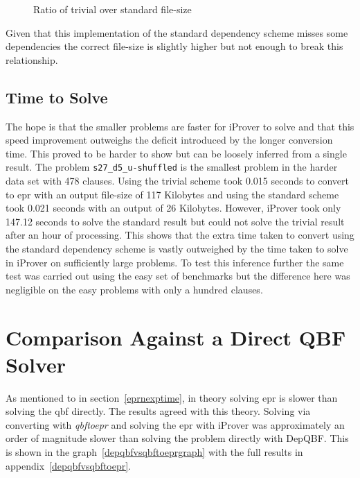 \begin{figure}[h]
\caption{Ratio of trivial over standard file-size}
\label{trivialsizeoverstandardsize}
\begin{CenteredBox}

\end{CenteredBox}
\end{figure}

Given that this implementation of the standard dependency scheme misses some dependencies the correct file-size is slightly higher but not enough to break this relationship.

\subsection{Time to Solve} \label{tvsstdsolve}
The hope is that the smaller problems are faster for iProver to solve and that this speed improvement outweighs the deficit introduced by the longer conversion time. This proved to be harder to show but can be loosely inferred from a single result. The problem \texttt{s27\_d5\_u-shuffled} is the smallest problem in the harder data set with 478 clauses. Using the trivial scheme took 0.015 seconds to convert to \gls{epr} with an output file-size of 117 Kilobytes and using the standard scheme took 0.021 seconds with an output of 26 Kilobytes. However, iProver took only 147.12 seconds to solve the standard result but could not solve the trivial result after an hour of processing. This shows that the extra time taken to convert using the standard dependency scheme is vastly outweighed by the time taken to solve in iProver on sufficiently large problems. To test this inference further the same test was carried out using the easy set of benchmarks but the difference here was negligible on the easy problems with only a hundred clauses.

\section{Comparison Against a Direct QBF Solver}
As mentioned to in section~\ref{eprnexptime}, in theory solving \gls{epr} is slower than solving the \gls{qbf} directly. The results agreed with this theory. Solving via converting with \textit{qbftoepr} and solving the \gls{epr} with iProver was approximately an order of magnitude slower than solving the problem directly with DepQBF. This is shown in the graph~\ref{depqbfvsqbftoeprgraph} with the full results in appendix~\ref{depqbfvsqbftoepr}.

